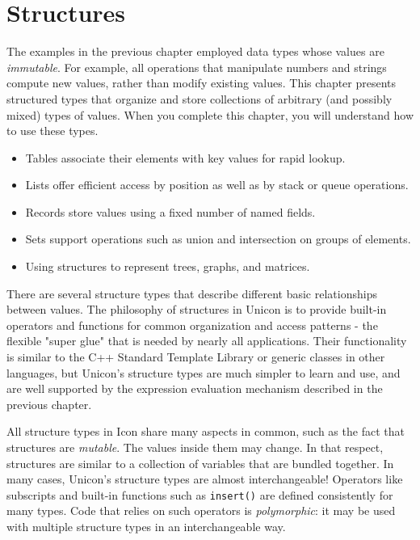 \chapter{Structures}

The examples in the previous chapter employed data types whose values
are \textit{immutable}. For example, all operations that manipulate
numbers and strings compute new values, rather than modify existing
values. This chapter presents structured types that organize and store
collections of arbitrary (and possibly mixed) types of values. When you
complete this chapter, you will understand how to use these types.
\begin{itemize}
  \item Tables associate their elements with key values for rapid lookup.
  \item Lists offer efficient access by position as well as by
    stack or queue operations.
  \item Records store values using a fixed number of named fields.
  \item Sets support operations such as union and intersection on groups
    of elements.
  \item Using structures to represent trees, graphs, and
    matrices.
\end{itemize}
There are several structure types that describe different basic
relationships between values. The philosophy of structures in Unicon is
to provide built-in operators and functions for common organization and
access patterns - the flexible "super glue"
that is needed by nearly all applications. Their functionality is
similar to the C++ Standard Template Library or generic classes in
other languages, but Unicon's structure types are much
simpler to learn and use, and are well supported by the expression
evaluation mechanism described in the previous chapter.

All structure types in Icon share many aspects in common, such as the
fact that structures are \textit{mutable}. The
values inside them may change. In that respect, structures are similar
to a collection of variables that are bundled together. In many cases,
Unicon's structure types are almost interchangeable!
Operators like subscripts and built-in functions such as
\texttt{insert()} are defined consistently for
many types. Code that relies on such operators is
\textit{polymorphic}: it may be used with multiple
structure types in an interchangeable way.

